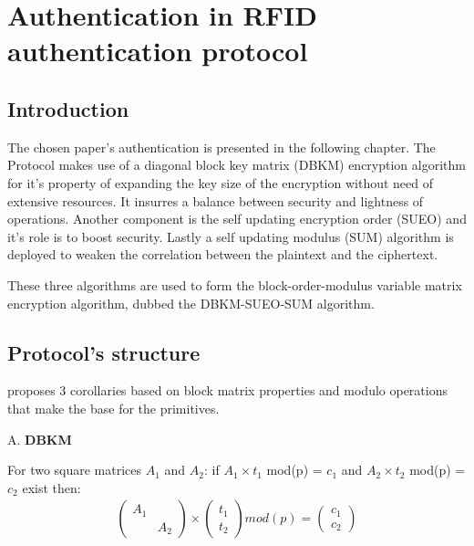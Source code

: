 \chapter{Authentication in RFID authentication protocol}

\section{Introduction}
    The chosen paper\cite{BOM}'s authentication is presented in the following chapter. The Protocol makes use of a diagonal block key matrix (DBKM) encryption algorithm for it's property of 
    expanding the key size of the encryption without need of extensive resources. It insurres a balance between security and lightness of operations. Another component is the self updating encryption 
    order (SUEO) and it's role is to boost security. Lastly a self updating modulus (SUM) algorithm is deployed to weaken the correlation between the plaintext and the ciphertext.
    
    These three algorithms are used to form the block-order-modulus variable matrix encryption algorithm, dubbed the DBKM-SUEO-SUM algorithm.

\section{Protocol's structure}

    \cite{BOM} proposes 3 corollaries based on block matrix properties and modulo operations that make the base for the primitives.

    A. \textbf{DBKM}

    For two square matrices $A_1$ and $A_2$: if $A_1 \times t_1$ mod(p) = $c_1$ and $A_2 \times t_2$ mod(p) = $c_2$ exist then:
    \begin{gather*}
        \begin{pmatrix}
        A_1 &  \\
            & A_2
        \end{pmatrix}
        \times
        \begin{pmatrix}
            t_1  \\
            t_2
        \end{pmatrix}
        mod(p)
        =
        \begin{pmatrix}
            c_1  \\
            c_2
        \end{pmatrix}
    \end{gather*}

